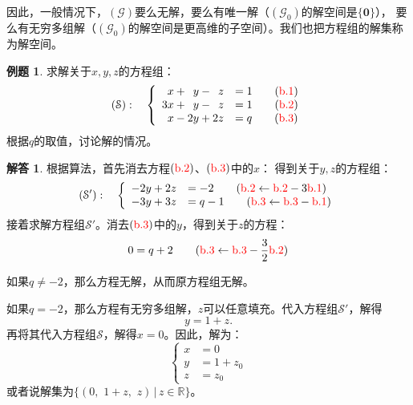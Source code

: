 \documentclass[12pt,UTF8]{ctexbook}
\theoremstyle{definition}
\newtheorem{et}{例题}[section]
\newtheorem*{so}{解答}
\theoremstyle{plain}
\begin{document}
因此，一般情况下，$(\mathcal{G})$要么无解，要么有唯一解（$(\mathcal{G}_0)$的解空间是$\{\mathbf{0}\}$），
要么有无穷多组解（$(\mathcal{G}_0)$的解空间是更高维的子空间）。我们也把方程组的解集称为解空间。

\begin{et}
    求解关于$x,y,z$的方程组：
    $$ (\mathcal{S}):\quad \left\{
        \begin{array}{rl}
            \phantom{0}x + \phantom{0}y - \phantom{0}z &= 1 \quad \quad ({\color{red}\mathrm{b}.1})\\
            3x + \phantom{0}y - \phantom{0}z &= 1  \quad \quad ({\color{red}\mathrm{b}.2}) \\
            \phantom{0}x - 2y  + 2z &= q  \quad \quad ({\color{red}\mathrm{b}.3}) \\
    \end{array}
    \right. $$
    根据$q$的取值，讨论解的情况。
    
\end{et}

\begin{so}
    根据算法，首先消去方程$({\color{red}\mathrm{b}.2})$、$({\color{red}\mathrm{b}.3})$中的$x$：
    得到关于$y,z$的方程组：
    $$ (\mathcal{S'}):\quad \left\{
        \begin{array}{rl}
            -2y + 2z &= -2  \quad \quad ({{\color{red}\mathrm{b}.2} \leftarrow {\color{red}\mathrm{b}.2} - 3\color{red}\mathrm{b}.1}) \\
            -3y  + 3z &= q - 1  \quad \quad ({{\color{red}\mathrm{b}.3} \leftarrow {\color{red}\mathrm{b}.3} - \color{red}\mathrm{b}.1})
    \end{array}
    \right. $$
    接着求解方程组$\mathcal{S'}$。消去$({\color{red}\mathrm{b}.3})$中的$y$，得到关于$z$的方程：
    $$ 0 = q + 2 \quad \quad ({{\color{red}\mathrm{b}.3} \leftarrow {\color{red}\mathrm{b}.3} - \frac{3}{2}\color{red}\mathrm{b}.2})$$
    
    如果$q \neq -2$，那么方程无解，从而原方程组无解。

    如果$q = -2$，那么方程有无穷多组解，$z$可以任意填充。代入方程组$\mathcal{S'}$，解得
    $$ y = 1 + z.$$
    再将其代入方程组$\mathcal{S}$，解得$x = 0$。因此，解为：
    $$ \left\{
    \begin{array}{rl}
    x &= 0 \\
    y &= 1 + z_0\\
    z &= z_0
    \end{array}
    \right. $$
    或者说解集为$\{(0, \,\,1 + z,\,\, z) \, | \, z\in \mathbb{R}\}$。

\end{so}
\end{document}
